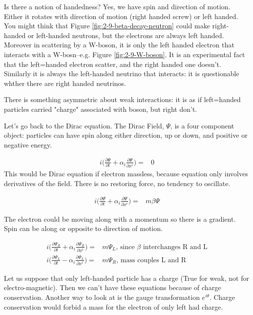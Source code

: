 \documentclass[]{article}
\begin{document}
Is there a notion of handedness? Yes, we have spin and direction of motion. Either it rotates with direction of motion (right handed screw) or left handed. You might think that Figure \ref{fig:2-9-beta-decay-neutron} could make right-handed or left-handed neutrons, but the electrons are always left handed. Moreover in scattering by a W-boson, it is only the left handed electron that interacts with a W-bosn--e.g. Figure \ref{fig:2-9-W-boson}. It is an experimental fact that the left=handed electron scatter, and the right handed one doesn't. Similarly it is always the left-handed neutrino that interacts: it is questionable whther there are right handed neutrinos.

There is something asymmetric about weak interactions: it is as if left=handed particles carried "charge" associated with boson, but right don't.

Let's go back to the Dirac equation. The Dirac Field, $\Psi$, is a four component object: particles can have spin along either direction, up or down, and positive or negative energy.

\begin{align*}
	i \big(\frac{\partial \Psi}{\partial t} + \alpha_i \frac{\partial \Psi}{\partial 	x^i}\big) =&0
\end{align*}
 This would be Dirac equation if electron massless, because equation only involves derivatives of the field. There is no restoring force, no tendency to oscillate.
 
 \begin{align*}
 	i \big(\frac{\partial \Psi}{\partial t} + \alpha_i \frac{\partial \Psi}{\partial 	x^i}\big) =&m \beta \Psi
 \end{align*}
 
 The electron could be moving along with a momentum so there is a gradient. Spin can be along or opposite to direction of motion. 
 
 \begin{align*}
 	i \big(\frac{\partial \Psi_R}{\partial t} + \alpha_i \frac{\partial \Psi_R}{\partial 	x^i}\big) =& m \Psi_L \text{, since $\beta$ interchanges R and L}\\
 	i \big(\frac{\partial \Psi_L}{\partial t} - \alpha_i \frac{\partial \Psi_L}{\partial 	x^i}\big) =& m \Psi_R \text{, mass couples L and R}
 \end{align*}
 
 Let us suppose that only left-handed particle has a charge (True for weak, not for electro-magnetic). Then we can't have these equations because of charge conservation. Another way to look at is the gauge transformation $e^{i\theta}$. Charge conservation would forbid a mass for the electron of only left had charge.
 
\end{document}
